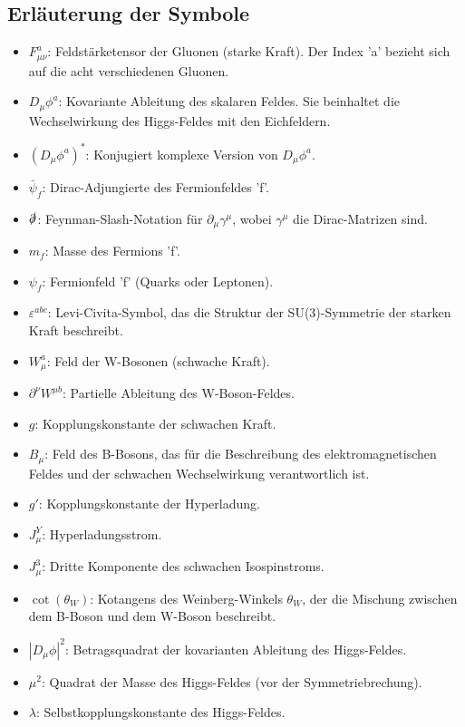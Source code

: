 \documentclass{article}
\begin{document}
	\subsection*{Erläuterung der Symbole}
	
	\begin{itemize}  %
		\item $F_{\mu\nu}^a$: Feldstärketensor der Gluonen (starke Kraft). Der Index 'a' bezieht sich auf die acht verschiedenen Gluonen.
		\item $D_\mu \phi^a$: Kovariante Ableitung des skalaren Feldes. Sie beinhaltet die Wechselwirkung des Higgs-Feldes mit den Eichfeldern.
		\item $(D_\mu \phi^a)^*$: Konjugiert komplexe Version von $D_\mu \phi^a$.
		\item $\bar{\psi}_f$: Dirac-Adjungierte des Fermionfeldes 'f'.
		\item $\slashed{\partial}$: Feynman-Slash-Notation für $\partial_\mu \gamma^\mu$, wobei $\gamma^\mu$ die Dirac-Matrizen sind.
		\item $m_f$: Masse des Fermions 'f'.
		\item $\psi_f$: Fermionfeld 'f' (Quarks oder Leptonen).
		\item $\varepsilon^{abc}$: Levi-Civita-Symbol, das die Struktur der SU(3)-Symmetrie der starken Kraft beschreibt.
		\item $W_\mu^a$: Feld der W-Bosonen (schwache Kraft).
		\item $\partial^\nu W^{\mu b}$: Partielle Ableitung des W-Boson-Feldes.
		\item $g$: Kopplungskonstante der schwachen Kraft.
		\item $B_\mu$: Feld des B-Bosons, das für die Beschreibung des elektromagnetischen Feldes und der schwachen Wechselwirkung verantwortlich ist.
		\item $g'$: Kopplungskonstante der Hyperladung.
		\item $J_\mu^Y$: Hyperladungsstrom.
		\item $J_\mu^3$: Dritte Komponente des schwachen Isospinstroms.
		\item $\cot(\theta_W)$: Kotangens des Weinberg-Winkels $\theta_W$, der die Mischung zwischen dem B-Boson und dem W-Boson beschreibt.
		\item $|D_\mu \phi|^2$: Betragsquadrat der kovarianten Ableitung des Higgs-Feldes.
		\item $\mu^2$: Quadrat der Masse des Higgs-Feldes (vor der Symmetriebrechung).
		\item $\lambda$: Selbstkopplungskonstante des Higgs-Feldes.

\end{itemize}
\end{document}
